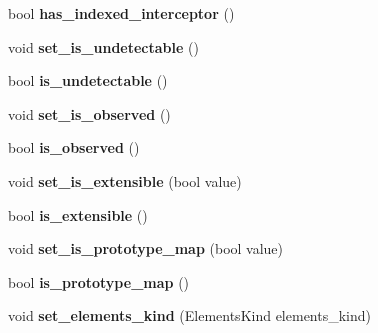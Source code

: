\begin{DoxyCompactItemize}
\item 
\hypertarget{classv8_1_1internal_1_1_map_ae380f57ebda320723bb35af1fb699221}{}bool {\bfseries has\+\_\+indexed\+\_\+interceptor} ()\label{classv8_1_1internal_1_1_map_ae380f57ebda320723bb35af1fb699221}

\item 
\hypertarget{classv8_1_1internal_1_1_map_a2c458a573eb4f99fd6064ed4bb9ff92d}{}void {\bfseries set\+\_\+is\+\_\+undetectable} ()\label{classv8_1_1internal_1_1_map_a2c458a573eb4f99fd6064ed4bb9ff92d}

\item 
\hypertarget{classv8_1_1internal_1_1_map_a97897da959f2d55c8673f0f103b44403}{}bool {\bfseries is\+\_\+undetectable} ()\label{classv8_1_1internal_1_1_map_a97897da959f2d55c8673f0f103b44403}

\item 
\hypertarget{classv8_1_1internal_1_1_map_ae9746bd9b3940e1c2294f3a8e3d4f9a2}{}void {\bfseries set\+\_\+is\+\_\+observed} ()\label{classv8_1_1internal_1_1_map_ae9746bd9b3940e1c2294f3a8e3d4f9a2}

\item 
\hypertarget{classv8_1_1internal_1_1_map_acb313b61066bc44d9a5ece88a6297d17}{}bool {\bfseries is\+\_\+observed} ()\label{classv8_1_1internal_1_1_map_acb313b61066bc44d9a5ece88a6297d17}

\item 
\hypertarget{classv8_1_1internal_1_1_map_a6848c21fd42fe4e93cd232d9fca8c7c0}{}void {\bfseries set\+\_\+is\+\_\+extensible} (bool value)\label{classv8_1_1internal_1_1_map_a6848c21fd42fe4e93cd232d9fca8c7c0}

\item 
\hypertarget{classv8_1_1internal_1_1_map_ad5e63da3d2873bd710dc54de69e3b781}{}bool {\bfseries is\+\_\+extensible} ()\label{classv8_1_1internal_1_1_map_ad5e63da3d2873bd710dc54de69e3b781}

\item 
\hypertarget{classv8_1_1internal_1_1_map_a82554c27e5fad70ac0fb029ab8176227}{}void {\bfseries set\+\_\+is\+\_\+prototype\+\_\+map} (bool value)\label{classv8_1_1internal_1_1_map_a82554c27e5fad70ac0fb029ab8176227}

\item 
\hypertarget{classv8_1_1internal_1_1_map_a85d2813ad1e3b923226d4e440ede0e79}{}bool {\bfseries is\+\_\+prototype\+\_\+map} ()\label{classv8_1_1internal_1_1_map_a85d2813ad1e3b923226d4e440ede0e79}

\item 
\hypertarget{classv8_1_1internal_1_1_map_a9632fe844e996ace79d586ba76d95911}{}void {\bfseries set\+\_\+elements\+\_\+kind} (Elements\+Kind elements\+\_\+kind)\label{classv8_1_1internal_1_1_map_a9632fe844e996ace79d586ba76d95911}


\end{DoxyCompactItemize}
